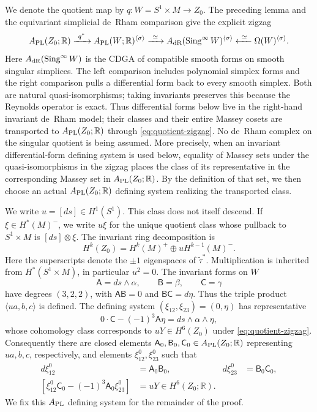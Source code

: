 \documentclass[11pt]{article}
\theoremstyle{remark}\newtheorem{remark}[theorem]{Remark}
\newcommand{\R}{\mathbb R}
\begin{document}
We denote the quotient map by $q:W=S^1\times M\to Z_0$.  The preceding lemma and
the equivariant simplicial de~Rham comparison give the explicit zigzag
\begin{equation}\label{eq:quotient-zigzag}
 A_{\rm PL}(Z_0;\R)\xrightarrow{\ q^*\ }
 A_{\rm PL}(W;\R)^{\langle\sigma\rangle}
 \xrightarrow{\ \simeq\ }
 A_{\rm dR}(\operatorname{Sing}^{\infty}W)^{\langle\sigma\rangle}
 \xleftarrow{\ \simeq\ }\Omega(W)^{\langle\sigma\rangle}.
\end{equation}
Here $A_{\rm dR}(\operatorname{Sing}^{\infty}W)$ is the CDGA of compatible
smooth forms on smooth singular simplices.  The left comparison includes
polynomial simplex forms and the right comparison pulls a differential
form back to every smooth simplex.  Both are natural
quasi-isomorphisms; taking invariants preserves this because the Reynolds
operator is exact.
Thus differential forms below live in the right-hand invariant de~Rham
model; their classes and their entire Massey cosets are transported to
$A_{\rm PL}(Z_0;\R)$ through \eqref{eq:quotient-zigzag}.  No de~Rham complex
on the singular quotient is being assumed.  More precisely, when an
invariant differential-form defining system is used below, equality of
Massey sets under the quasi-isomorphisms in the zigzag places the class of
its representative in the corresponding Massey set in
$A_{\rm PL}(Z_0;\R)$.  By the definition of that set, we then choose an
actual $A_{\rm PL}(Z_0;\R)$ defining system realizing the transported
class.

We write $u=[ds]\in H^1(S^1)$.  This class does not itself descend.  If
$\xi\in H^*(M)^-$, we write $u\xi$ for the unique quotient class whose
pullback to $S^1\times M$ is $[ds]\otimes\xi$.  The invariant ring
decomposition is
\begin{equation}\label{eq:quotient-cohom}
H^k(Z_0)=H^k(M)^+\oplus uH^{k-1}(M)^-.
\end{equation}
Here the superscripts denote the $\pm1$ eigenspaces of
$\widetilde\tau^*$.
Multiplication is inherited from $H^*(S^1\times M)$, in particular $u^2=0$.
The invariant forms on $W$
\begin{equation}\label{eq:ABC-forms}
\mathsf A=ds\wedge\alpha,\qquad \mathsf B=\beta,\qquad \mathsf C=\gamma
\end{equation}
have degrees $(3,2,2)$, with $\mathsf A\mathsf B=0$ and
$\mathsf B\mathsf C=d\eta$.  Thus the triple product
$\langle ua,b,c\rangle$ is defined.  The defining system
$(\xi_{12},\xi_{23})=(0,\eta)$ has representative
\[
0\cdot\mathsf C-(-1)^3\mathsf A\eta
=ds\wedge\alpha\wedge\eta,
\]
whose cohomology class corresponds to $uY\in H^6(Z_0)$ under
\eqref{eq:quotient-zigzag}.  Consequently there are closed elements
$\mathsf A_0,\mathsf B_0,\mathsf C_0\in A_{\rm PL}(Z_0;\R)$ representing
$ua,b,c$, respectively, and elements $\xi_{12}^0,\xi_{23}^0$ such that
\begin{align}
 d\xi_{12}^0&=\mathsf A_0\mathsf B_0,&
 d\xi_{23}^0&=\mathsf B_0\mathsf C_0,
 \label{eq:APL-defining-system}\\
 \left[\xi_{12}^0\mathsf C_0-(-1)^3
 \mathsf A_0\xi_{23}^0\right]&=uY\in H^6(Z_0;\R).
 \label{eq:APL-representative}
\end{align}
We fix this $A_{\rm PL}$ defining system for the remainder of the proof.
\end{document}
